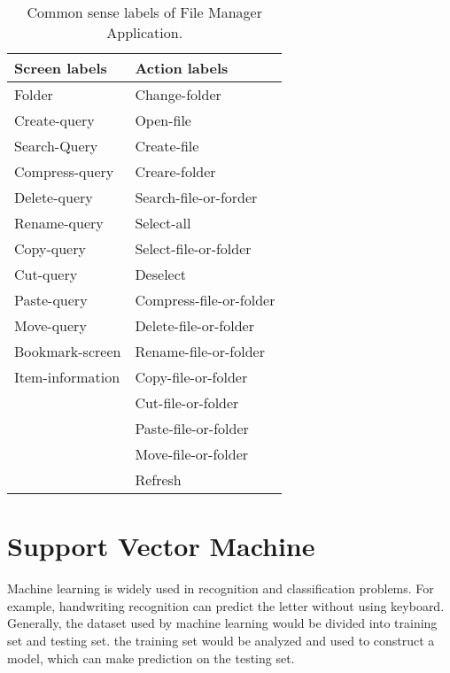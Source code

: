 \begin{table}[ht]
	\begin{center}
		\begin{tabular}{ l | l }
			\hline
			Screen labels & Action labels \\
			\hline\hline
			Folder & Change-folder \\
			Create-query & Open-file \\
			Search-Query & Create-file \\
			Compress-query & Creare-folder \\
			Delete-query & Search-file-or-forder \\
			Rename-query & Select-all \\
			Copy-query & Select-file-or-folder \\
			Cut-query & Deselect \\
			Paste-query & Compress-file-or-folder \\
			Move-query & Delete-file-or-folder \\
			Bookmark-screen & Rename-file-or-folder \\
			Item-information & Copy-file-or-folder \\
			  & Cut-file-or-folder \\
			  & Paste-file-or-folder \\
			  & Move-file-or-folder \\
			  & Refresh \\
			
		\end{tabular}
		\caption{ Common sense labels of File Manager Application.  }
		\label{LabelDictionaryTable}
	\end{center}
\end{table}


\clearpage

\section{Support Vector Machine}

Machine learning is widely used in recognition and classification problems.
For example, handwriting recognition can predict the letter without using keyboard.
Generally, the dataset used by machine learning would be divided into training set and testing set.
the training set would be analyzed and used to construct a model,
which can make prediction on the testing set.


